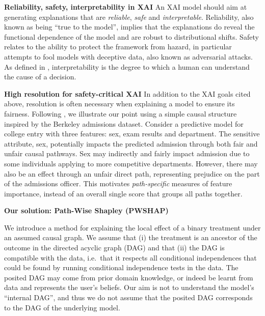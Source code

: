 \documentclass{article}
\theoremstyle{plain}
\theoremstyle{definition}
\theoremstyle{remark}
\theoremstyle{mystyle}
\begin{document}
\textbf{Reliability, safety, interpretability in XAI} 
An XAI model should aim at generating explanations that are \emph{reliable}, \emph{safe} and \emph{interpretable}. Reliability, also known as being ``true to the model'', implies that the explanations do reveal the functional dependence of the model and are robust to distributional shifts. Safety relates to the ability to protect the framework from hazard, in particular attempts to fool models with deceptive data, also known as adversarial attacks. As defined in , interpretability is the degree to which a human can understand the cause of a decision. 


\textbf{High resolution for safety-critical XAI}
In addition to the XAI goals cited above, resolution is often necessary when explaining a model to ensure its fairness. Following , we illustrate our point using a simple causal structure inspired by the Berkeley admissions dataset. Consider a predictive model for college entry with three features: sex, exam results and department. The sensitive attribute, sex, potentially impacts the predicted admission through both fair and unfair causal pathways. Sex may indirectly and fairly impact admission due to some individuals applying to more competitive departments. However, there may also be an effect through an unfair direct path, representing prejudice on the part of the admissions officer. This motivates \emph{path-specific} measures of feature importance, instead of an overall single score that groups all paths together. 

\newpage
\textbf{Our solution: Path-Wise Shapley (PWSHAP)} \quad 

We introduce a method for explaining the local effect of a binary treatment under an assumed causal graph. We assume that (i) the treatment is an ancestor of the outcome in the directed acyclic graph (DAG) and that (ii) the DAG is compatible with the data, i.e.\ that it respects all conditional independences that could be found by running conditional independence tests in the data.  The posited DAG may come from prior domain knowledge, or indeed be learnt from data and represents the user's beliefs. Our aim is not to understand the model's ``internal DAG'', and thus we do not assume that the posited DAG corresponds to the DAG of the underlying model.
\end{document}
